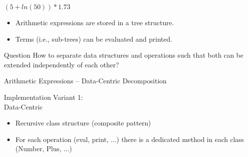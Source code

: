 \begin{frame}{\myframetitle}
	\begin{mycolumns}[widths={60}]
		\begin{exampletight}{$(5 + ln(50)) * 1.73$}
			\centering
		\end{exampletight}
	\mynextcolumn
		\begin{example}{}
			\begin{itemize}
				\item Arithmetic expressions are stored in a tree structure.
				\item Terms (i.e., sub-trees) can be evaluated and printed.
			\end{itemize}
		\end{example}
		\begin{note}{Question}
			How to separate data structures and operations such that both can be extended independently of each other?
		\end{note}
	\end{mycolumns}
\end{frame}

\begin{frame}{Arithmetic Expressions -- Data-Centric Decomposition}
	\begin{mycolumns}[widths={40},animation=none]
		\begin{definition}{Implementation Variant 1:\\Data-Centric}
			\begin{itemize}
				\item Recursive class structure (composite pattern)
				\item For each operation (eval, print, ...) there is a dedicated method in each class (Number, Plus, ...) 				
			\end{itemize}
		\end{definition}
	\mynextcolumn
		\begin{exampletight}{}
		\end{exampletight}
	\end{mycolumns}
\end{frame}

